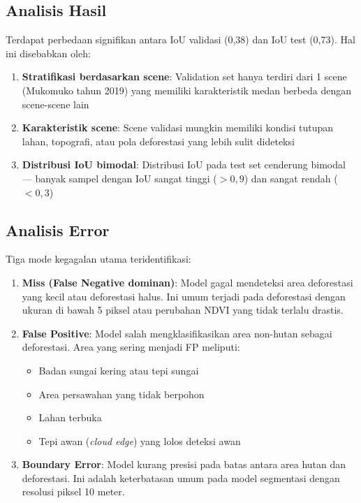 \documentclass[12pt,a4paper]{article}
\begin{document}
\subsection{Analisis Hasil}

Terdapat perbedaan signifikan antara IoU validasi (0,38) dan IoU test (0,73). 
Hal ini disebabkan oleh:

\begin{enumerate}[nosep]
    \item \textbf{Stratifikasi berdasarkan scene}: Validation set hanya terdiri 
          dari 1 scene (Mukomuko tahun 2019) yang memiliki karakteristik medan 
          berbeda dengan scene-scene lain
    \item \textbf{Karakteristik scene}: Scene validasi mungkin memiliki kondisi 
          tutupan lahan, topografi, atau pola deforestasi yang lebih sulit 
          dideteksi
    \item \textbf{Distribusi IoU bimodal}: Distribusi IoU pada test set 
          cenderung bimodal — banyak sampel dengan IoU sangat tinggi ($>0,9$) 
          dan sangat rendah ($<0,3$)
\end{enumerate}

\subsection{Analisis Error}

Tiga mode kegagalan utama teridentifikasi:

\begin{enumerate}[nosep]
    \item \textbf{Miss (False Negative dominan)}: Model gagal mendeteksi area 
          deforestasi yang kecil atau deforestasi halus. Ini umum terjadi pada 
          deforestasi dengan ukuran di bawah 5 piksel atau perubahan NDVI 
          yang tidak terlalu drastis.
    \item \textbf{False Positive}: Model salah mengklasifikasikan area non-hutan 
          sebagai deforestasi. Area yang sering menjadi FP meliputi:
          \begin{itemize}[nosep]
              \item Badan sungai kering atau tepi sungai
              \item Area persawahan yang tidak berpohon
              \item Lahan terbuka
              \item Tepi awan (\textit{cloud edge}) yang lolos deteksi awan
          \end{itemize}
    \item \textbf{Boundary Error}: Model kurang presisi pada batas antara area 
          hutan dan deforestasi. Ini adalah keterbatasan umum pada model 
          segmentasi dengan resolusi piksel 10 meter.
\end{enumerate}
\end{document}
